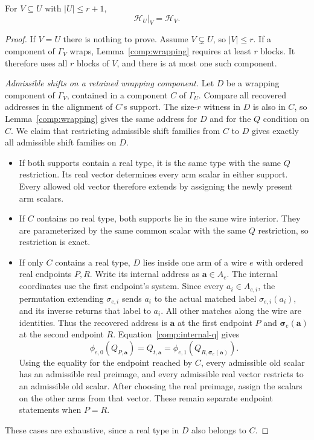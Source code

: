 \begin{lemma}\label{comp:projection}
For $V\subseteq U$ with $|U|\leq r+1$,
\begin{equation}\label{comp:projection-equation}
                         \mathcal H_U\big|_V=\mathcal H_V.
\end{equation}
\end{lemma}
\begin{proof}
If $V=U$ there is nothing to prove.  Assume $V\subsetneq U$, so
$|V|\leq r$.  If a component of $\Gamma_V$ wraps,
Lemma~\ref{comp:wrapping} requires at least $r$ blocks.  It therefore
uses all $r$ blocks of $V$, and there is at most one such component.

\emph{Admissible shifts on a retained wrapping component.}
Let $D$ be a wrapping component of $\Gamma_V$, contained in a component
$C$ of $\Gamma_U$.  Compare all recovered addresses in the alignment
of $C$'s support.  The size-$r$ witness in $D$ is also in $C$, so
Lemma~\ref{comp:wrapping} gives the same address for $D$ and for the
$Q$ condition on $C$.  We claim that restricting admissible shift
families from $C$ to $D$ gives exactly all admissible shift families
on $D$.
\begin{itemize}
\item If both supports contain a real type, it is the same type with
  the same $Q$ restriction.  Its real vector determines every arm
  scalar in either support.  Every allowed old vector therefore
  extends by assigning the newly present arm scalars.
\item If $C$ contains no real type, both supports lie in the same
  wire interior.  They are parameterized by the same common scalar
  with the same $Q$ restriction, so restriction is exact.
\item If only $C$ contains a real type, $D$ lies inside one arm of a
  wire $e$ with ordered real endpoints $P,R$.  Write its internal
  address as $\mathbf a\in A_e$.  The internal coordinates use the
  first endpoint's system.  Since every $a_i\in A_{e,i}$, the permutation
  extending $\sigma_{e,i}$ sends $a_i$ to the actual matched label
  $\sigma_{e,i}(a_i)$, and its inverse returns that label to $a_i$.
  All other matches along the wire are identities.
  Thus the recovered address is $\mathbf a$ at the first endpoint $P$
  and $\boldsymbol\sigma_e(\mathbf a)$ at the second endpoint $R$.
  Equation~\eqref{comp:internal-q} gives
  \[
   \phi_{e,0}(Q_{P,\mathbf a})
   =Q_{t,\mathbf a}
   =\phi_{e,1}(Q_{R,\boldsymbol\sigma_e(\mathbf a)}).
  \]
  Using the equality for the endpoint reached by $C$, every admissible
  old scalar has an admissible real preimage, and every admissible real
  vector restricts to an admissible old scalar.  After choosing the real
  preimage, assign the scalars on the other arms from that vector.
  These remain separate endpoint statements when $P=R$.
\end{itemize}
These cases are exhaustive, since a real type in $D$ also belongs to $C$.


\end{proof}
